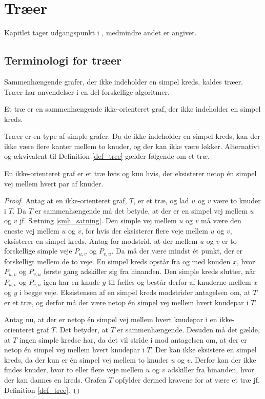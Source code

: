 \chapter{Træer}
Kapitlet tager udgangspunkt i \citep{dmat}, medmindre andet er angivet.

\section{Terminologi for træer}

Sammenhængende grafer, der ikke indeholder en simpel kreds, kaldes træer. Træer har anvendelser i en del forskellige algoritmer.

\begin{defn}
Et træ er en sammenhængende ikke-orienteret graf, der ikke indeholder en simpel kreds.
\label{def_tree}
\end{defn}

Træer er en type af simple grafer. Da de ikke indeholder en simpel kreds, kan der ikke være flere kanter mellem to knuder, og der kan ikke være løkker. Alternativt og ækvivalent til Definition \ref{def_tree} gælder følgende om et træ.

\begin{thm}\label{thm:vej_tree}
En ikke-orienteret graf er et træ hvis og kun hvis, der eksisterer netop én simpel vej mellem hvert par af knuder. 
\end{thm}

\begin{proof}
	Antag at en ikke-orienteret graf, $T$, er et træ, og lad $u$ og $v$ være to knuder i $T$. 
	Da $T$ er sammenhængende må det betyde, at der er en simpel vej mellem $u$ og $v$ jf. Sætning \ref{smh_satning}. 
	Den simple vej mellem $u$ og $v$ må være den eneste vej mellem $u$ og $v$, for hvis der eksisterer flere veje mellem $u$ og $v$, eksisterer en simpel kreds. 
	Antag for modstrid, at der mellem $u$ og $v$ er to forskellige simple veje $P_{u,v}$ og $P_{v,u}$. Da må der være mindst ét punkt, der er forskelligt mellem de to veje. 
	En simpel kreds opstår fra og med knuden $x$, hvor $P_{u,v}$ og $P_{v,u}$ første gang adskiller sig fra hinanden. 
	Den simple kreds slutter, når $P_{u,v}$ og $P_{v,u}$ igen har en knude $y$ til fælles og består derfor af knuderne mellem $x$ og $y$ i begge veje.
	Eksistensen af en simpel kreds modstrider antagelsen om, at $T$ er et træ, og derfor må der være netop én simpel vej mellem hvert knudepar i $T$.

Antag nu, at der er netop én simpel vej mellem hvert knudepar i en ikke-orienteret graf $T$.
	Det betyder, at $T$ er sammenhængende. Desuden må det gælde, at $T$ ingen simple kredse har, da det vil stride i mod antagelsen om, at der er netop én simpel vej mellem hvert knudepar i $T$.
	Der kan ikke eksistere en simpel kreds, da der kun er én simpel vej mellem to knuder $u$ og $v$. Derfor kan der ikke findes knuder, hvor to eller flere veje mellem $u$ og $v$ adskiller fra hinanden, hvor der kan dannes en kreds.
	Grafen $T$ opfylder dermed kravene for at være et træ jf. Definition \ref{def_tree}.
\end{proof}

